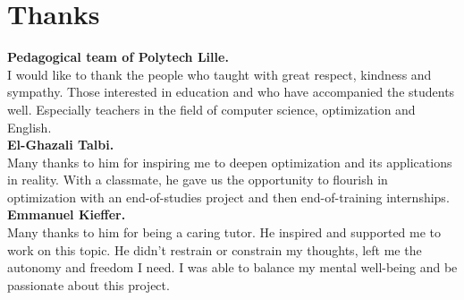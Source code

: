 \chapter*{Thanks}

\textbf{Pedagogical team of Polytech Lille.}\\
I would like to thank the people who taught with great respect, kindness and sympathy. Those interested in education and who have accompanied the students well. Especially teachers in the field of computer science, optimization and English.\\

\textbf{El-Ghazali Talbi.}\\
Many thanks to him for inspiring me to deepen optimization and its applications in reality. With a classmate, he gave us the opportunity to flourish in optimization with an end-of-studies project and then end-of-training internships.\\

\textbf{Emmanuel Kieffer.}\\
Many thanks to him for being a caring tutor. He inspired and supported me to work on this topic. He didn't restrain or constrain my thoughts, left me the autonomy and freedom I need. I was able to balance my mental well-being and be passionate about this project.